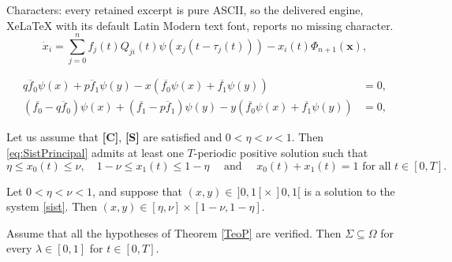 \documentclass[10pt,a4paper]{amsart}
\begin{document}
Characters: every retained excerpt is pure ASCII, so the delivered engine, XeLaTeX with its default Latin Modern text font, reports no missing character.
\begin{equation}\label{eq:SistPrincipal}
\dot{x}_i = \sum_{j=0}^n f_j(t) Q_{ji} (t)\psi(x_j(t - \tau_j(t))) - x_i(t) \Phi_{n+1}(\mathbf{x}),
\end{equation}

\begin{equation}\label{sist}
\begin{array}{rc}
     \overline{qf_0}\psi(x)+\overline{pf_1}\psi(y)-x(\overline{f_0}\psi(x)+\overline{f_1}\psi(y))&=0,  \\
     (\overline{f_0}-\overline{qf_0})\psi(x)+(\overline{f_1}-\overline{pf_1})\psi(y)-y(\overline{f_0}\psi(x)+\overline{f_1}\psi(y))&=0, 
\end{array}
\end{equation}

\begin{Theorem}\label{TeoP}   Let us assume that  \textbf{[C]},    \textbf{[S]}  are satisfied and $0<\eta<\nu<1$.  Then  \eqref{eq:SistPrincipal} admits at least one $T$-periodic positive solution  such that\begin{equation*}
     \eta\leq x_0(t)\leq \nu,\quad 1-\nu\leq x_1(t)\leq1-\eta \quad \mbox{ and } \quad x_0(t)+x_1(t)=1 \mbox{ for all }t\in[0,T].
\end{equation*}
\end{Theorem}

\begin{Lemma}\label{Fromt}
Let $0 < \eta < \nu < 1$, and suppose that $(x, y) \in \,]0,1[ \times \,]0,1[$ is a solution to the system \eqref{sist}. Then $(x, y) \in [\eta, \nu] \times [1 - \nu, 1 - \eta].$
\end{Lemma}

\begin{Lemma}\label{cots1} Assume that all the hypotheses of Theorem \ref{TeoP} are verified. Then $\Sigma\subseteq \Omega$ for every $\lambda\in [0,1]$ for $t\in [0,T].$
\end{Lemma}
\end{document}
